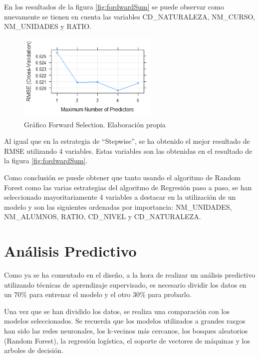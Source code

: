 \begin{subappendices}
En los resultados de la figura \ref{fig:fordwardSum} se puede observar como nuevamente se tienen en cuenta las variables CD\_NATURALEZA, NM\_CURSO, NM\_UNIDADES y RATIO.

\begin{figure}[htb]
	\centering
	\caption{Gráfico Forward Selection. Elaboración propia}
	\label{fig:fordward}
	\includegraphics[width=0.6\textwidth]{recursos/ImagenesR/fordward}
\end{figure}
\FloatBarrier

Al igual que en la estrategia de ``Stepwise'', se ha obtenido el mejor resultado de RMSE utilizando 4 variables. Estas variables son las obtenidas en el resultado de la figura \ref{fig:fordwardSum}.	

Como conclusión se puede obtener que tanto usando el algoritmo de Random Forest como las varias estrategias del algoritmo de Regresión paso a paso, se han seleccionado mayoritariamente 4 variables a destacar en la utilización de un modelo y son las siguientes ordenadas por importancia: NM\_UNIDADES, NM\_ALUMNOS, RATIO, CD\_NIVEL y CD\_NATURALEZA. 
\end{subappendices}



\chapter{Análisis Predictivo}
\setcounter{figure}{0} \renewcommand{\thefigure}{B.\arabic{figure}}
\setcounter{table}{0} \renewcommand{\thetable}{B.\arabic{table}}

Como ya se ha comentado en el diseño, a la hora de realizar un análisis predictivo utilizando técnicas de aprendizaje supervisado, es necesario dividir los datos en un 70\% para entrenar el modelo y el otro 30\% para probarlo.

Una vez que se han dividido los datos, se realiza una comparación con los modelos seleccionados. Se recuerda que los modelos utilizados a grandes rasgos han sido las redes neuronales, los k-vecinos más cercanos, los bosques aleatorios (Random Forest), la regresión logística, el soporte de vectores de máquinas y los arboles de decisión.

